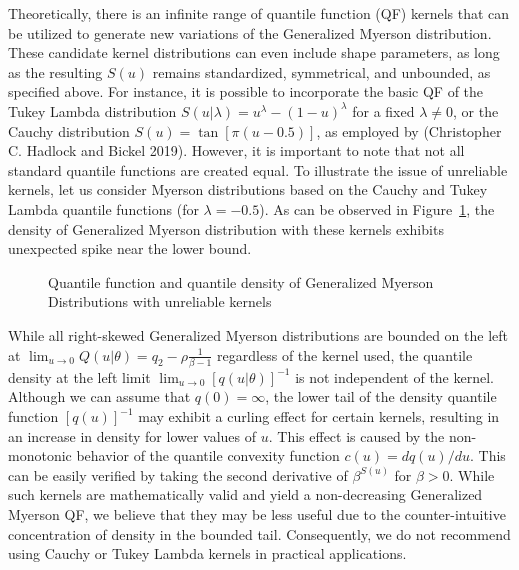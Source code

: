\documentclass[
]{interact}
\begin{document}
Theoretically, there is an infinite range of quantile function (QF)
kernels that can be utilized to generate new variations of the
Generalized Myerson distribution. These candidate kernel distributions
can even include shape parameters, as long as the resulting \(S(u)\)
remains standardized, symmetrical, and unbounded, as specified above.
For instance, it is possible to incorporate the basic QF of the Tukey
Lambda distribution \(S(u\vert\lambda)=u^\lambda-(1-u)^\lambda\) for a
fixed \(\lambda \neq 0\), or the Cauchy distribution
\(S(u)=\tan[\pi(u-0.5)]\), as employed by (Christopher C. Hadlock and
Bickel 2019). However, it is important to note that not all standard
quantile functions are created equal. To illustrate the issue of
unreliable kernels, let us consider Myerson distributions based on the
Cauchy and Tukey Lambda quantile functions (for \(\lambda=-0.5\)). As
can be observed in Figure~\ref{fig-gmyerson-qfdqf-plot2}, the density of
Generalized Myerson distribution with these kernels exhibits unexpected
spike near the lower bound.

\begin{figure}


\caption{\label{fig-gmyerson-qfdqf-plot2}Quantile function and quantile
density of Generalized Myerson Distributions with unreliable kernels}

\end{figure}%

While all right-skewed Generalized Myerson distributions are bounded on
the left at
\(\lim_{u\rightarrow0}Q(u\vert\theta)=q_2-\rho\frac{1}{\beta-1}\)
regardless of the kernel used, the quantile density at the left limit
\(\lim_{u\rightarrow0}[q(u\vert\theta)]^{-1}\) is not independent of the
kernel. Although we can assume that \(q(0)=\infty\), the lower tail of
the density quantile function \([q(u)]^{-1}\) may exhibit a curling
effect for certain kernels, resulting in an increase in density for
lower values of \(u\). This effect is caused by the non-monotonic
behavior of the quantile convexity function \(c(u)=dq(u)/du\). This can
be easily verified by taking the second derivative of \(\beta^{S(u)}\)
for \(\beta>0\). While such kernels are mathematically valid and yield a
non-decreasing Generalized Myerson QF, we believe that they may be less
useful due to the counter-intuitive concentration of density in the
bounded tail. Consequently, we do not recommend using Cauchy or Tukey
Lambda kernels in practical applications.
\end{document}
